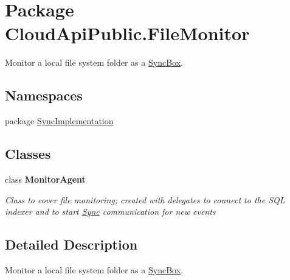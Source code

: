 \hypertarget{namespace_cloud_api_public_1_1_file_monitor}{\section{Package Cloud\-Api\-Public.\-File\-Monitor}
\label{namespace_cloud_api_public_1_1_file_monitor}
}


Monitor a local file system folder as a \hyperlink{class_cloud_api_public_1_1_sync_box}{Sync\-Box}.  


\subsection*{Namespaces}
\begin{DoxyCompactItemize}
\item 
package \hyperlink{namespace_cloud_api_public_1_1_file_monitor_1_1_sync_implementation}{Sync\-Implementation}
\end{DoxyCompactItemize}
\subsection*{Classes}
\begin{DoxyCompactItemize}
\item 
class {\bfseries Monitor\-Agent}
\begin{DoxyCompactList}\small\item\em Class to cover file monitoring; created with delegates to connect to the S\-Q\-L indexer and to start \hyperlink{namespace_cloud_api_public_1_1_sync}{Sync} communication for new events \end{DoxyCompactList}\end{DoxyCompactItemize}


\subsection{Detailed Description}
Monitor a local file system folder as a \hyperlink{class_cloud_api_public_1_1_sync_box}{Sync\-Box}. 